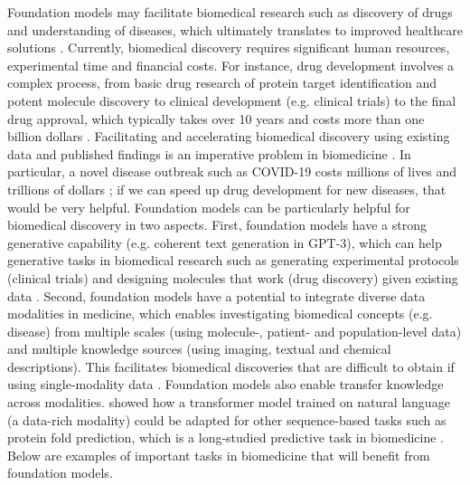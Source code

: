 Foundation models may facilitate biomedical research such as discovery of drugs and understanding of diseases, which ultimately translates to improved healthcare solutions \citep{hanney2015long}. Currently, biomedical discovery requires significant human resources, experimental time and financial costs. For instance, drug development involves a complex process, from basic drug research of protein target identification and potent molecule discovery to clinical development (e.g. clinical trials) to the final drug approval, which typically takes over 10 years and costs more than one billion dollars \citep{wouters2020estimated}. Facilitating and accelerating biomedical discovery using existing data and published findings is an imperative problem in biomedicine \citep{yu2018artificial}. In particular, a novel disease outbreak such as COVID-19 costs millions of lives and trillions of dollars  \citep{lalmuanawma2020applications,mckibbin2020economic}; if we can speed up drug development for new diseases, that would be very helpful. Foundation models can be particularly helpful for biomedical discovery in two aspects. First, foundation models have a strong generative capability (e.g. coherent text generation in GPT-3), which can help generative tasks in biomedical research such as generating experimental protocols (clinical trials) and designing molecules that work (drug discovery) given existing data \citep{kadurin2017drugan,harrer2019artificial}. Second, foundation models have a potential to integrate diverse data modalities in medicine, which enables investigating biomedical concepts (e.g. disease) from multiple scales (using molecule-, patient- and population-level data) and multiple knowledge sources (using imaging, textual and chemical descriptions). This facilitates biomedical discoveries that are difficult to obtain if using single-modality data \citep{lanckriet2004statistical,aerts2006gene,kong2011integrative,ribeiro2012classification,wang2014drug,wang2015kernel,ruiz2020identification,wu2021babel}. Foundation models also enable transfer knowledge across modalities. \citet{DBLP:journals/corr/abs-2103-05247} showed how a transformer model trained on natural language (a data-rich modality) could be adapted for other sequence-based tasks such as protein fold prediction, which is a long-studied predictive task in biomedicine \citep{jumper2020high}. Below are examples of important tasks in biomedicine that will benefit from foundation models.

